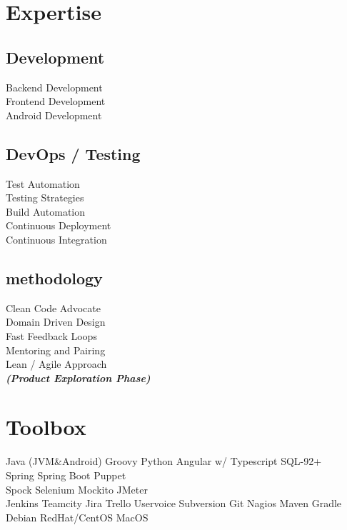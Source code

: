 \documentclass[]{resume}
\begin{document}
\begin{minipage}[t]{0.32\textwidth}

\section{Expertise}
\subsection{Development}
Backend Development \\
Frontend Development \\
Android Development \\
\sectionsep

\subsection{DevOps / Testing}
Test Automation \\
Testing Strategies \\
Build Automation \\
Continuous Deployment \\
Continuous Integration \\
\sectionsep

\subsection{methodology}
Clean Code Advocate \\
Domain Driven Design \\
Fast Feedback Loops \\
Mentoring and Pairing \\
Lean / Agile Approach \\
{\footnotesize \textit{\textbf{(Product Exploration Phase) }}} \\
\sectionsep


\section{Toolbox}
Java (JVM\&Android) \textbullet{} Groovy \textbullet{} Python 
\textbullet{} Angular w/ Typescript \textbullet{} SQL-92+\\
Spring \textbullet{} Spring Boot \textbullet{} Puppet\\
Spock \textbullet{} Selenium \textbullet{} Mockito \textbullet{} JMeter\\
Jenkins \textbullet{} Teamcity \textbullet{} Jira \textbullet{} Trello 
\textbullet{} Uservoice \textbullet{} Subversion \textbullet{} Git  \textbullet{} Nagios \textbullet{} Maven \textbullet{} Gradle \\
Debian \textbullet{} RedHat/CentOS \textbullet{} MacOS
\sectionsep

%
%

\end{minipage} 
\end{document}
